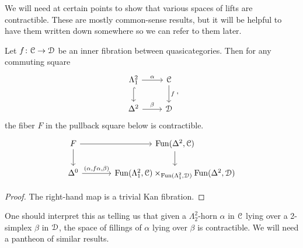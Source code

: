 \documentclass[main.tex]{subfiles}
\begin{document}
We will need at certain points to show that various spaces of lifts are contractible. These are mostly common-sense results, but it will be helpful to have them written down somewhere so we can refer to them later.

\begin{lemma}
  \label{lemma:inner_fib_contractible_fibers}
  Let $f\colon \mathcal{C} \to \mathcal{D}$ be an inner fibration between quasicategories. Then for any commuting square
  \begin{equation*}
    \begin{tikzcd}
      \Lambda^{2}_{1}
      \arrow[r, "\alpha"]
      \arrow[d, hook]
      & \category{C}
      \arrow[d, "f"]
      \\
      \Delta^{2}
      \arrow[r, "\beta"]
      & \category{D}
    \end{tikzcd},
  \end{equation*}
  the fiber $F$ in the pullback square below is contractible.
  \begin{equation*}
    \begin{tikzcd}[column sep=large]
      F
      \arrow[r]
      \arrow[d]
      & \Fun(\Delta^{2}, \category{C})
      \arrow[d]
      \\
      \Delta^{0}
      \arrow[r, "{(\alpha, f\alpha, \beta)}"]
      & \Fun(\Lambda^{2}_{1}, \category{C}) \times_{\Fun(\Lambda^{2}_{1}, \category{D})} \Fun(\Delta^{2}, \category{D})
    \end{tikzcd}
  \end{equation*}
\end{lemma}
\begin{proof}
  The right-hand map is a trivial Kan fibration.
\end{proof}

One should interpret this as telling us that given a $\Lambda^{2}_{2}$-horn $\alpha$ in $\mathcal{C}$ lying over a 2-simplex $\beta$ in $\mathcal{D}$, the space of fillings of $\alpha$ lying over $\beta$ is contractible. We will need a pantheon of similar results.
\end{document}
